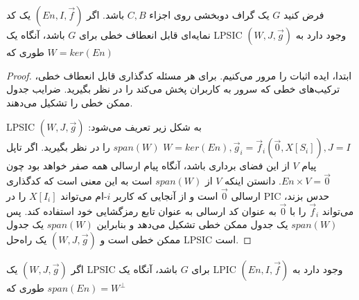 \begin{example}

\end{example}


\begin{lemma}
    فرض کنید $G$ یک گراف دوبخشی روی اجزاء $C, B$ باشد. اگر $(En, I, \overrightarrow{f})$ یک کد نمایه‌ای قابل انعطاف خطی برای $G$ باشد، آنگاه یک LPSIC $(W, J, \overrightarrow{g})$ وجود دارد به طوری که $W  = ker(En)$
\end{lemma}

\begin{proof}
    ابتدا، ایده اثبات را مرور می‌کنیم. برای هر مسئله کدگذاری قابل انعطاف خطی، ترکیب‌های خطی که سرور به کاربران پخش می‌کند را در نظر بگیرید. ضرایب جدول ممکن خطی را تشکیل می‌دهند.

    LPSIC $(W, J, \overrightarrow{g})$ به شکل زیر تعریف می‌شود: $W = ker(En), \overrightarrow{g}_i = \overrightarrow{f}_i(\overrightarrow{0}, X[S_i]), J = I$
    $span(W)$ را در نظر بگیرید. اگر تاپل پیام $V$ از این فضای برداری باشد، آنگاه پیام ارسالی همه صفر خواهد بود چون $En \times V = \overrightarrow{0}$. دانستن اینکه $V$ از $span(W)$ است به این معنی است که کدگذاری ارسالی $\overrightarrow{0}$ است و از آنجایی که کاربر $i$-ام می‌تواند $X[I_i]$ را در PIC حدس بزند، می‌تواند $\overrightarrow{f}_i$ را با $\overrightarrow{0}$ به عنوان کد ارسالی به عنوان تابع رمزگشایی خود استفاده کند. پس $span(W)$ یک جدول ممکن خطی تشکیل می‌دهد و بنابراین $span(W)$ یک جدول ممکن خطی است و $(W, J, \overrightarrow{g})$ یک راه‌حل LPSIC است.
\end{proof}

\begin{lemma}
    اگر $(W, J, \overrightarrow{g})$ یک LPSIC برای $G$ باشد، آنگاه یک LPIC $(En, I, \overrightarrow{f})$ وجود دارد به طوری که $span(En) = W^{\bot}$
\end{lemma}

